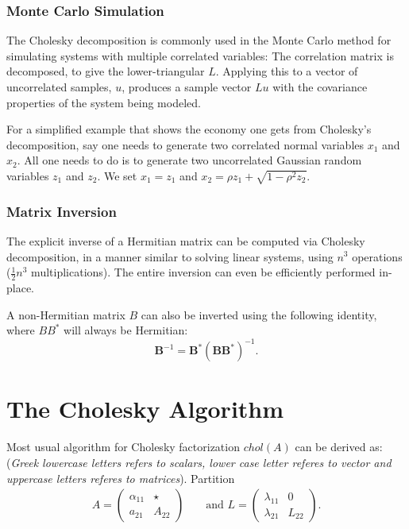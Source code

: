 \subsubsection*{Monte Carlo Simulation}
The Cholesky decomposition is commonly used in the Monte Carlo method for simulating systems with multiple correlated variables: The correlation matrix is decomposed, to give the lower-triangular $L$. Applying this to a vector of uncorrelated samples, $u$, produces a sample vector $Lu$ with the covariance properties of the system being modeled.

For a simplified example that shows the economy one gets from Cholesky's decomposition, say one needs to generate two correlated normal variables $x_1$ and $x_2$. All one needs to do is to generate two uncorrelated Gaussian random variables $z_1$ and $z_2$. We set $x_1=z_1$ and $x_2 = \rho z_1 + \sqrt{1-\rho ^2 z_2}$.

\subsubsection*{Matrix Inversion}
The explicit inverse of a Hermitian matrix can be computed via Cholesky decomposition, in a manner similar to solving linear systems, using $\textstyle{n^3}$ operations ($\textstyle\frac{1}{2}n^3$ multiplications). The entire inversion can even be efficiently performed in-place.

A non-Hermitian matrix $B$ can also be inverted using the following identity, where $BB^*$ will always be Hermitian:
\begin{equation*}
\mathbf{B}^{-1} = \mathbf{B}^{*} \mathbf{(B B ^ {*})}^{-1}.	
\end{equation*}

\section{The Cholesky Algorithm}
Most usual algorithm for Cholesky factorization $chol(A)$ can be derived as: (\textit{Greek lowercase letters refers to scalars, lower case letter referes to vector and uppercase letters referes to matrices}). Partition
\begin{equation*}
\begin{aligned}
	A=
	\left(
\begin{array}{c|c}
\alpha_{11}  & \star \\ \hline
a_{21} & A_{22}
\end{array}
\right)
& &
\text{ and }
L=
\left(
\begin{array}{c|c}
\lambda_{11}  & 0 \\ \hline
\lambda_{21} & L_{22}
\end{array}\right).	
\end{aligned}
\end{equation*}

